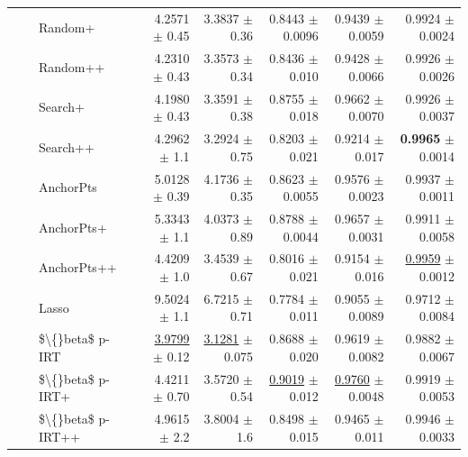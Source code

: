 \begin{longtable}{llp{}rrrrr}
 &  & Random+ & 4.2571 {\scriptsize $\pm$ 0.45} & 3.3837 {\scriptsize $\pm$ 0.36} & 0.8443 {\scriptsize $\pm$ 0.0096} & 0.9439 {\scriptsize $\pm$ 0.0059} & 0.9924 {\scriptsize $\pm$ 0.0024} \\
 &  & Random++ & 4.2310 {\scriptsize $\pm$ 0.43} & 3.3573 {\scriptsize $\pm$ 0.34} & 0.8436 {\scriptsize $\pm$ 0.010} & 0.9428 {\scriptsize $\pm$ 0.0066} & 0.9926 {\scriptsize $\pm$ 0.0026} \\
 &  & Search+ & 4.1980 {\scriptsize $\pm$ 0.43} & 3.3591 {\scriptsize $\pm$ 0.38} & 0.8755 {\scriptsize $\pm$ 0.018} & 0.9662 {\scriptsize $\pm$ 0.0070} & 0.9926 {\scriptsize $\pm$ 0.0037} \\
 &  & Search++ & 4.2962 {\scriptsize $\pm$ 1.1} & 3.2924 {\scriptsize $\pm$ 0.75} & 0.8203 {\scriptsize $\pm$ 0.021} & 0.9214 {\scriptsize $\pm$ 0.017} & \textbf{0.9965} {\scriptsize $\pm$ 0.0014} \\
 &  & AnchorPts & 5.0128 {\scriptsize $\pm$ 0.39} & 4.1736 {\scriptsize $\pm$ 0.35} & 0.8623 {\scriptsize $\pm$ 0.0055} & 0.9576 {\scriptsize $\pm$ 0.0023} & 0.9937 {\scriptsize $\pm$ 0.0011} \\
 &  & AnchorPts+ & 5.3343 {\scriptsize $\pm$ 1.1} & 4.0373 {\scriptsize $\pm$ 0.89} & 0.8788 {\scriptsize $\pm$ 0.0044} & 0.9657 {\scriptsize $\pm$ 0.0031} & 0.9911 {\scriptsize $\pm$ 0.0058} \\
 &  & AnchorPts++ & 4.4209 {\scriptsize $\pm$ 1.0} & 3.4539 {\scriptsize $\pm$ 0.67} & 0.8016 {\scriptsize $\pm$ 0.021} & 0.9154 {\scriptsize $\pm$ 0.016} & \underline{0.9959} {\scriptsize $\pm$ 0.0012} \\
 &  & Lasso & 9.5024 {\scriptsize $\pm$ 1.1} & 6.7215 {\scriptsize $\pm$ 0.71} & 0.7784 {\scriptsize $\pm$ 0.011} & 0.9055 {\scriptsize $\pm$ 0.0089} & 0.9712 {\scriptsize $\pm$ 0.0084} \\
 &  & \$\textbackslash\{\}beta\$ p-IRT & \underline{3.9799} {\scriptsize $\pm$ 0.12} & \underline{3.1281} {\scriptsize $\pm$ 0.075} & 0.8688 {\scriptsize $\pm$ 0.020} & 0.9619 {\scriptsize $\pm$ 0.0082} & 0.9882 {\scriptsize $\pm$ 0.0067} \\
 &  & \$\textbackslash\{\}beta\$ p-IRT+ & 4.4211 {\scriptsize $\pm$ 0.70} & 3.5720 {\scriptsize $\pm$ 0.54} & \underline{0.9019} {\scriptsize $\pm$ 0.012} & \underline{0.9760} {\scriptsize $\pm$ 0.0048} & 0.9919 {\scriptsize $\pm$ 0.0053} \\
 &  & \$\textbackslash\{\}beta\$ p-IRT++ & 4.9615 {\scriptsize $\pm$ 2.2} & 3.8004 {\scriptsize $\pm$ 1.6} & 0.8498 {\scriptsize $\pm$ 0.015} & 0.9465 {\scriptsize $\pm$ 0.011} & 0.9946 {\scriptsize $\pm$ 0.0033} \\

\end{longtable}
